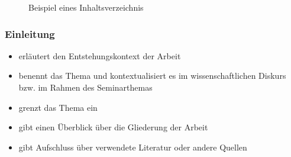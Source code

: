\documentclass[ 12pt,
                titlepage,
                parskip=half,
                version=first,
                bibliography=totocnumbered,
                final,
                listof=totoc]{scrartcl}
\begin{document}
\begin{figure}[ht]
\centering
{}
\caption{Beispiel eines Inhaltsverzeichnis}
\label{img:inhaltsverzeichnis}
\end{figure}

\subsubsection{Einleitung}

\begin{itemize}
    \item erläutert den Entstehungskontext der Arbeit
    \item benennt das Thema und kontextualisiert es im wissenschaftlichen
    Diskurs bzw. im Rahmen des Seminarthemas
    \item grenzt das Thema ein
    \item gibt einen Überblick über die Gliederung der Arbeit
    \item gibt Aufschluss über verwendete Literatur oder andere Quellen
\end{itemize}
\end{document}
